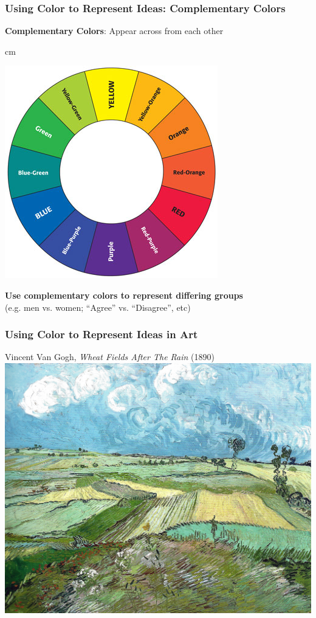 \documentclass{beamer} %
\begin{document}
\begin{frame}\frametitle{Using Color to Represent Ideas:  Complementary Colors}
	\centering
	
	\textbf{Complementary Colors}:  Appear across from each other
	
	 cm
	
	\includegraphics[width=0.6\linewidth]{colorwheel2}
	
	\textbf{Use complementary colors to represent differing groups} \\(e.g. men vs. women; ``Agree'' vs. ``Disagree'', etc)
	
\end{frame}


\begin{frame}\frametitle{Using Color to Represent Ideas in Art}
	\centering
	
	Vincent Van Gogh, \emph{Wheat Fields After The Rain} (1890)\\
	
	\includegraphics[width=0.87\linewidth]{vangogh}
	
\end{frame}
\end{document}
